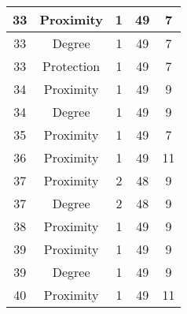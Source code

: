 \documentclass[results.tex]{subfiles}
\begin{document}
\begin{center}
\begin{tabular}{| c || c | c | c | c |}
            \hline
            33                      & Proximity                    & 1                      & 49                      & 7                    \\
            \hline
            33                      & Degree                       & 1                      & 49                      & 7                    \\
            \hline
            33                      & Protection                   & 1                      & 49                      & 7                    \\
            \hline
            34                      & Proximity                    & 1                      & 49                      & 9                    \\
            \hline
            34                      & Degree                       & 1                      & 49                      & 9                    \\
            \hline
            35                      & Proximity                    & 1                      & 49                      & 7                    \\
            \hline
            36                      & Proximity                    & 1                      & 49                      & 11                   \\
            \hline
            37                      & Proximity                    & 2                      & 48                      & 9                    \\
            \hline
            37                      & Degree                       & 2                      & 48                      & 9                    \\
            \hline
            38                      & Proximity                    & 1                      & 49                      & 9                    \\
            \hline
            39                      & Proximity                    & 1                      & 49                      & 9                    \\
            \hline
            39                      & Degree                       & 1                      & 49                      & 9                    \\
            \hline
            40                      & Proximity                    & 1                      & 49                      & 11                   \\

\end{tabular}
\end{center}
\end{document}

